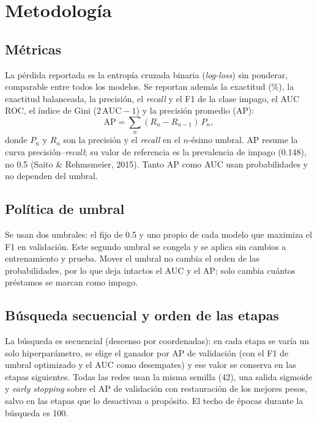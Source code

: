 \documentclass[12pt,a4paper]{article}
\begin{document}
\section{Metodología}\label{sec:metodo}

\subsection{Métricas}

La pérdida reportada es la entropía cruzada binaria (\textit{log-loss}) sin ponderar, comparable entre todos los modelos. Se reportan además la exactitud (\%), la exactitud balanceada, la precisión, el \textit{recall} y el F1 de la clase impago, el AUC ROC, el índice de Gini ($2\,\text{AUC}-1$) y la precisión promedio (AP):
\begin{equation}\label{eq:ap}
\text{AP} = \sum_{n} (R_n - R_{n-1})\,P_n ,
\end{equation}
donde $P_n$ y $R_n$ son la precisión y el \textit{recall} en el $n$-ésimo umbral. AP resume la curva precisión--\textit{recall}; su valor de referencia es la prevalencia de impago (0.148), no 0.5 (Saito \& Rehmsmeier, 2015). Tanto AP como AUC usan probabilidades y no dependen del umbral.

\subsection{Política de umbral}

Se usan dos umbrales: el fijo de 0.5 y uno propio de cada modelo que maximiza el F1 en validación. Este segundo umbral se congela y se aplica sin cambios a entrenamiento y prueba. Mover el umbral no cambia el orden de las probabilidades, por lo que deja intactos el AUC y el AP; solo cambia cuántos préstamos se marcan como impago.

\subsection{Búsqueda secuencial y orden de las etapas}

La búsqueda es secuencial (descenso por coordenadas): en cada etapa se varía un solo hiperparámetro, se elige el ganador por AP de validación (con el F1 de umbral optimizado y el AUC como desempates) y ese valor se conserva en las etapas siguientes. Todas las redes usan la misma semilla (42), una salida sigmoide y \textit{early stopping} sobre el AP de validación con restauración de los mejores pesos, salvo en las etapas que lo desactivan a propósito. El techo de épocas durante la búsqueda es 100.
\end{document}
